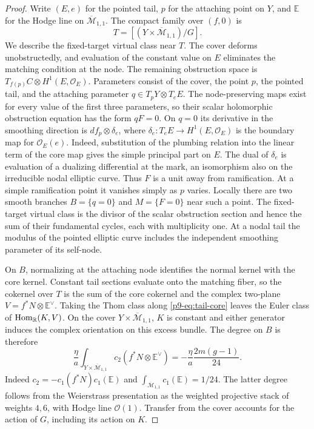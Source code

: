 \begin{proof}
Write $(E,e)$ for the pointed tail, $p$ for the attaching point on $Y$,
and $\mathbb E$ for the Hodge line on $\overline{\mathcal M}_{1,1}$.
The compact family over $(f,0)$ is
\[
 T=[(Y\times\overline{\mathcal M}_{1,1})/G].
\]
We describe the fixed-target virtual class near $T$. The cover
deforms unobstructedly, and evaluation of the constant value on $E$
eliminates the matching condition at the node. The remaining obstruction
space is $T_{f(p)}C\otimes H^1(E,\mathcal O_E)$. Parameters consist of
the cover, the point $p$, the pointed tail, and the attaching parameter
$q\in T_pY\otimes T_eE$. The node-preserving maps exist for every value
of the first three parameters, so their scalar holomorphic obstruction
equation has the form $q F=0$. On $q=0$ its derivative in the smoothing
direction is $df_p\otimes\delta_e$, where
$\delta_e:T_eE\to H^1(E,\mathcal O_E)$ is the boundary map for
$\mathcal O_E(e)$. Indeed, substitution of the plumbing relation into
the linear term of the core map gives the simple principal part on $E$.
The dual of $\delta_e$ is evaluation of a dualizing differential at the
mark, an isomorphism also on the irreducible nodal elliptic curve.
Thus $F$ is a unit away from ramification. At a simple ramification
point it vanishes simply as $p$ varies. Locally there are two smooth branches
$B=\{q=0\}$ and $M=\{F=0\}$ near such a point. The fixed-target
virtual class is the divisor of the scalar obstruction section and hence
the sum of their fundamental cycles, each with multiplicity one. At a
nodal tail the modulus of the pointed elliptic curve includes the
independent smoothing parameter of its self-node.

On $B$, normalizing at the attaching node identifies the normal kernel
with the core kernel. Constant tail sections evaluate onto the matching
fiber, so the cokernel over $T$ is the sum of the core cokernel and the
complex two-plane $V=f^*N\otimes\mathbb E^\vee$. Taking the Thom class
along \eqref{p9-eq:tail-core} leaves the Euler class of
$\operatorname{Hom}_{\mathbb R}(K,V)$. On the cover
$Y\times\overline{\mathcal M}_{1,1}$, $K$ is constant and either
generator induces the complex orientation on this excess bundle. The
degree on $B$ is therefore
\begin{equation}\label{p9-eq:tail-moving}
 \frac{\eta}{a}\int_{Y\times\overline{\mathcal M}_{1,1}}
 c_2(f^*N\otimes\mathbb E^\vee)
 =-\frac{\eta}{a}\frac{2m(g-1)}{24}.
\end{equation}
Indeed $c_2=-c_1(f^*N)c_1(\mathbb E)$ and
$\int_{\overline{\mathcal M}_{1,1}}c_1(\mathbb E)=1/24$.
The latter degree follows from the Weierstrass presentation as the
weighted projective stack of weights $4,6$, with Hodge line
$\mathcal O(1)$. Transfer from the
cover accounts for the action of $G$, including its action on $K$.


\end{proof}
